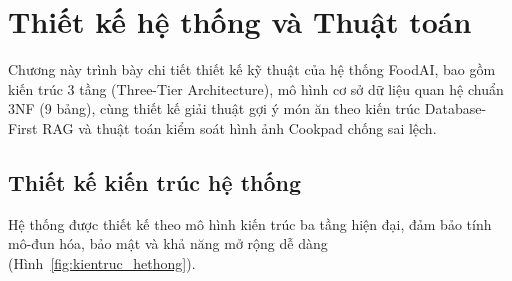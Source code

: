 \chapter{Thiết kế hệ thống và Thuật toán}
\label{ch:thietke}

\begin{muctieu}
Chương này trình bày chi tiết thiết kế kỹ thuật của hệ thống FoodAI, bao gồm kiến trúc 3 tầng (Three-Tier Architecture), mô hình cơ sở dữ liệu quan hệ chuẩn 3NF (9 bảng), cùng thiết kế giải thuật gợi ý món ăn theo kiến trúc Database-First RAG và thuật toán kiểm soát hình ảnh Cookpad chống sai lệch.
\end{muctieu}

\section{Thiết kế kiến trúc hệ thống}

Hệ thống được thiết kế theo mô hình kiến trúc ba tầng  hiện đại, đảm bảo tính mô-đun hóa, bảo mật và khả năng mở rộng dễ dàng (Hình~\ref{fig:kientruc_hethong}).

